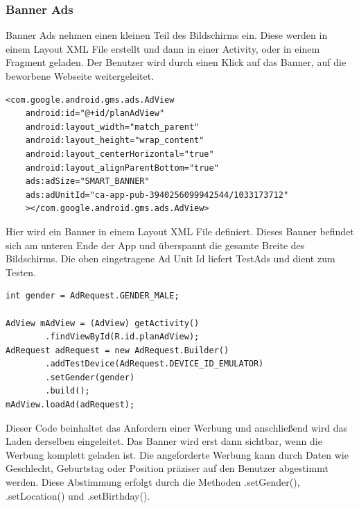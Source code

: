 \documentclass[FIPLY_base.tex]{subfiles}
\begin{document}
\newpage
\subsubsection{Banner Ads}
Banner Ads nehmen einen kleinen Teil des Bildschirms ein. Diese werden in einem Layout XML File erstellt und dann in einer Activity, oder in einem Fragment geladen. 
Der Benutzer wird durch einen Klick auf das Banner, auf die beworbene Webseite weitergeleitet. 
\ \\
\begin{lstlisting}
<com.google.android.gms.ads.AdView
    android:id="@+id/planAdView"
    android:layout_width="match_parent"
    android:layout_height="wrap_content"
    android:layout_centerHorizontal="true"
    android:layout_alignParentBottom="true"
    ads:adSize="SMART_BANNER"
    ads:adUnitId="ca-app-pub-3940256099942544/1033173712"
    ></com.google.android.gms.ads.AdView>
\end{lstlisting}
Hier wird ein Banner in einem Layout XML File definiert. Dieses Banner befindet sich am unteren Ende der App und überspannt die gesamte Breite des Bildschirms.
Die oben eingetragene Ad Unit Id liefert TestAds und dient zum Testen.
\ \\
\begin{lstlisting}
int gender = AdRequest.GENDER_MALE;

AdView mAdView = (AdView) getActivity()
        .findViewById(R.id.planAdView);
AdRequest adRequest = new AdRequest.Builder()
        .addTestDevice(AdRequest.DEVICE_ID_EMULATOR)
        .setGender(gender)
        .build();
mAdView.loadAd(adRequest);
\end{lstlisting}
Dieser Code beinhaltet das Anfordern einer Werbung und anschließend wird das Laden derselben eingeleitet.
Das Banner wird erst dann sichtbar, wenn die Werbung komplett geladen ist. 
Die angeforderte Werbung kann durch Daten wie Geschlecht, Geburtstag oder Position präziser auf den Benutzer abgestimmt werden.
Diese Abstimmung erfolgt durch die Methoden .setGender(), .setLocation() und .setBirthday().	

\newpage
\end{document}
